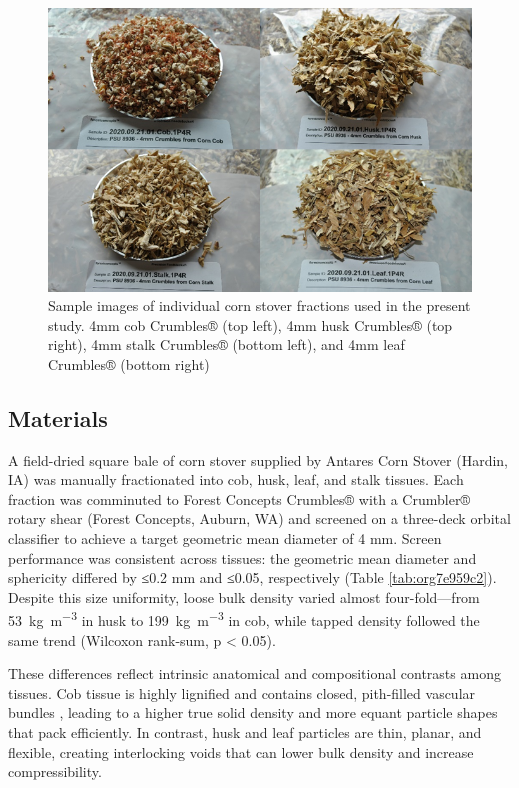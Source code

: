 \documentclass[xcolor=dvipsnames,10pt,hidelinks]{article}
\let\oldsubsection\subsection
\renewcommand{\subsection}{\clearpage\oldsubsection}
\begin{document}
\begin{figure}[htbp]
\centering
\includegraphics[width=.9\linewidth]{figures/image2.png}
\caption{\label{fig:orgd615e45}Sample images of individual corn stover fractions used in the present study. 4mm cob Crumbles® (top left), 4mm husk Crumbles® (top right), 4mm stalk Crumbles® (bottom left), and 4mm leaf Crumbles® (bottom right)}
\end{figure}
\subsection{Materials}
\label{sec:orgfd6aefe}
A field-dried square bale of corn stover supplied by Antares Corn Stover (Hardin, IA) was manually fractionated into cob, husk, leaf, and stalk tissues.
Each fraction was comminuted to Forest Concepts Crumbles® with a Crumbler® rotary shear (Forest Concepts, Auburn, WA) and
screened on a three-deck orbital classifier to achieve a target geometric mean diameter of 4 mm.
Screen performance was consistent across tissues:
the geometric mean diameter and sphericity differed by ≤0.2 mm and ≤0.05, respectively (Table \ref{tab:org7e959c2}).
Despite this size uniformity, loose bulk density varied almost four-fold—from \qty{53}{\kilo\gram\per\cubic\meter} in husk
to \qty{199}{\kilo\gram\per\cubic\meter} in cob, while tapped density followed the same trend (Wilcoxon rank-sum, p < 0.05).

These differences reflect intrinsic anatomical and compositional contrasts among tissues.
Cob tissue is highly lignified \parencite{berchem_corn_2017} and contains closed, pith-filled vascular bundles \parencite{thornburg_mass_2022},
leading to a higher true solid density and more equant particle shapes that pack efficiently.
In contrast, husk and leaf particles are thin, planar, and flexible, creating interlocking voids \parencite{thornburg_mass_2022,li_characterization_2020} that
can lower bulk density and increase compressibility.
\end{document}
